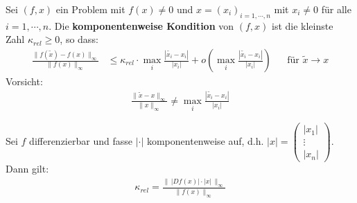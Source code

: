 \begin{Defe}
  Sei $(f, x) $ ein Problem mit $f(x)\neq 0$ und $x=(x_i)_{i=1,\cdots , n}$ mit $x_i\neq 0 $  für alle $i=1,\cdots, n$.
  Die \textbf{komponentenweise Kondition} von $(f,x) $ ist die kleinste Zahl $\kappa_{rel}\geq 0$, so dass:
  \begin{align*}
    \frac{\|f(\widetilde{x})-f(x)\|_\infty}{\|f(x)\|_\infty} 
    &\leq \kappa_{rel} \cdot \underset{i}{\max}\frac{|\widetilde{x_i}-x_i|}{|x_i|}+ o\left(\underset{i}{\max}\frac{|\widetilde{x_i}-x_i|}{|x_i|}\right) 
    && \text{für }\widetilde{x}\rightarrow x
  \end{align*}
  Vorsicht:
  \begin{gather*}
    \frac{\|\widetilde{x}-x\|_\infty}{\|x\|_\infty}\neq \underset{i}{\max}\frac{|\widetilde{x_i}-x_i|}{|x_i|}
  \end{gather*}
\end{Defe}

\begin{Leme}
  \label{3.2.17}
  Sei $f$ differenzierbar und fasse $|\cdot|$ komponentenweise auf, d.h. $|x| = \begin{pmatrix}
    |x_1| \\
    \vdots \\
    |x_n|
  \end{pmatrix}$.
  Dann gilt:
  \begin{gather}
    \kappa_{rel} = \frac{\|\, |Df(x)|\cdot |x| \, \|_\infty}{\|f(x)\|_\infty} \label{III.2.16}
  \end{gather}
\end{Leme}

